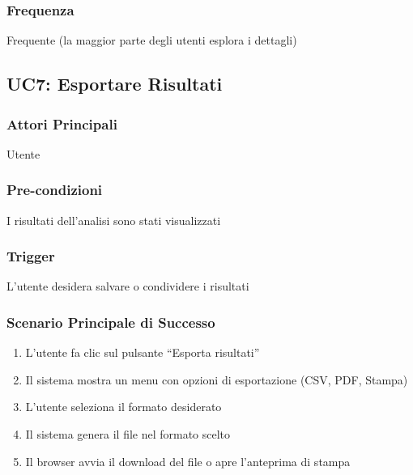 \subsubsection{Frequenza}
Frequente (la maggior parte degli utenti esplora i dettagli)

\subsection{UC7: Esportare Risultati}

\subsubsection{Attori Principali}
Utente

\subsubsection{Pre-condizioni}
I risultati dell'analisi sono stati visualizzati

\subsubsection{Trigger}
L'utente desidera salvare o condividere i risultati

\subsubsection{Scenario Principale di Successo}
\begin{enumerate}
    \item L'utente fa clic sul pulsante ``Esporta risultati''
    \item Il sistema mostra un menu con opzioni di esportazione (CSV, PDF, Stampa)
    \item L'utente seleziona il formato desiderato
    \item Il sistema genera il file nel formato scelto
    \item Il browser avvia il download del file o apre l'anteprima di stampa
\end{enumerate}

